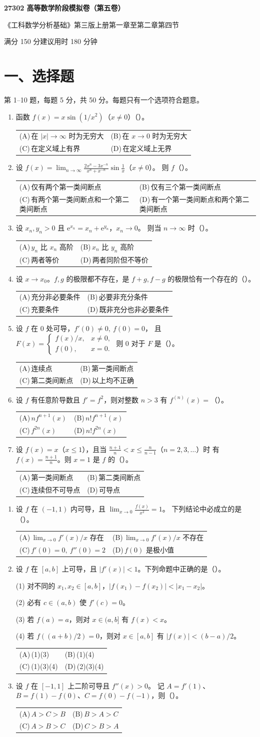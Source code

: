 \documentclass[UTF8,a4paper,zihao=-4,fontset=fandol]{ctexart}
\makeatletter
\newcommand{\choices}[4]{%
  \par\noindent\begin{tabularx}{\linewidth}{@{}X@{\hspace{1em}}X@{}}
    (A)\,#1 & (B)\,#2 \\
    (C)\,#3 & (D)\,#4
  \end{tabularx}\par}
\newcommand{\paper}[1]{%
  \pdfbookmark[0]{第#1卷}{paper.\thepage}%
  \begin{center}
    {\LARGE\bfseries 27302 高等数学阶段模拟卷（第#1卷）\par}
    \small 《工科数学分析基础》第三版上册第一章至第二章第四节\par
    满分 150 分\qquad 建议用时 180 分钟
  \end{center}
  \section*{一、选择题}
  第 1--10 题，每题 5 分，共 50 分。每题只有一个选项符合题意。}
\makeatother
\begin{document}
\newpage
\paper{五}
\begin{enumerate}
\item 函数 $f(x)=x\sin(1/x^2)$（$x\ne0$）（\quad）。
\choices{在 $|x|\to\infty$ 时为无穷大}{在 $x\to0$ 时为无穷大}
{在定义域上有界}{在定义域上无界}
\item 设 $\displaystyle f(x)=\lim_{n\to\infty}\frac{2x^n-3x^{-n}}{x^n+x^{-n}}\sin\frac1x$（$x\ne0$）。
则 $f$（\quad）。
\choices{仅有两个第一类间断点}{仅有三个第一类间断点}
{有两个第一类间断点和一个第二类间断点}{有一个第一类间断点和两个第二类间断点}
\item 设 $x_n,y_n>0$ 且 $\mathrm{e}^{x_n}=x_n+\mathrm{e}^{y_n}$，$x_n\to0$。
则当 $n\to\infty$ 时（\quad）。
\choices{$y_n$ 比 $x_n$ 高阶}{$x_n$ 比 $y_n$ 高阶}{两者等价}{两者同阶但不等价}
\item 设 $x\to x_0$。$f,g$ 的极限都不存在，是 $f+g,f-g$ 的极限恰有一个存在的（\quad）。
\choices{充分非必要条件}{必要非充分条件}{充要条件}{既非充分也非必要条件}
\item 设 $f$ 在 $0$ 处可导，$f'(0)\ne0,\ f(0)=0$，
且 $F(x)=\begin{cases}f(x)/x,&x\ne0,\\f(0),&x=0.\end{cases}$
则 $0$ 对于 $F$ 是（\quad）。
\choices{连续点}{第一类间断点}{第二类间断点}{以上均不正确}
\item 设 $f$ 有任意阶导数且 $f'=f^2$，则对整数 $n>3$ 有 $f^{(n)}(x)=$（\quad）。
\choices{$nf^{n+1}(x)$}{$n!f^{n+1}(x)$}{$f^{2n}(x)$}{$n!f^{2n}(x)$}
\item 设 $f(x)=x$（$x\le1$），且当 $\frac{n+1}{n}<x\le\frac{n}{n-1}$（$n=2,3,\dots$）时
有 $f(x)=\frac{n+1}{n}$。则 $x=1$ 是 $f$ 的（\quad）。
\choices{第一类间断点}{第二类间断点}{连续但不可导点}{可导点}
\end{enumerate}
\newpage
\begin{enumerate}[start=8]
\item 设 $f$ 在 $(-1,1)$ 内可导，且 $\displaystyle\lim_{x\to0}\frac{f(x)}{x^2}=1$。
下列结论中必成立的是（\quad）。
\choices{$\lim_{x\to0}f'(x)/x$ 存在}{$\lim_{x\to0}f'(x)/x$ 不存在}
{$f'(0)=0,\ f''(0)=2$}{$f(0)$ 是极小值}
\item 设 $f$ 在 $[a,b]$ 上可导，且 $|f'(x)|<1$。下列命题中正确的是（\quad）。
\par (1) 对不同的 $x_1,x_2\in[a,b]$，$|f(x_1)-f(x_2)|<|x_1-x_2|$。
\par (2) 必有 $c\in(a,b)$ 使 $f'(c)=0$。
\par (3) 若 $f(a)=a$，则对 $x\in(a,b]$ 有 $f(x)<x$。
\par (4) 若 $f((a+b)/2)=0$，则对 $x\in[a,b]$ 有 $|f(x)|<(b-a)/2$。
\choices{(1)(3)}{(1)(4)}{(1)(3)(4)}{(2)(3)(4)}
\item 设 $f$ 在 $[-1,1]$ 上二阶可导且 $f''(x)>0$。
记 $A=f'(1)$、$B=f(1)-f(0)$、$C=f(0)-f(-1)$，则（\quad）。
\choices{$A>C>B$}{$B>A>C$}{$A>B>C$}{$C>B>A$}
\end{enumerate}
\end{document}
